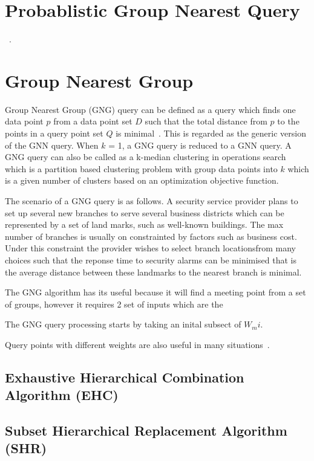 \documentclass[a4paper,11pt]{article}
\begin{document}
\section{Probablistic Group Nearest Query}

~\cite{lian2008probabilistic}.

\section{Group Nearest Group}

Group Nearest Group (GNG) query can be defined as a query which finds one data
point $p$ from a data point set $D$ such that the total distance from $p$ to
the points in a query point set $Q$ is minimal~\cite{deng2012group}. This is
regarded as the generic version of the GNN query. When $k$ = 1, a GNG query is
reduced to a GNN query. A GNG query can also be called as a k-median
clustering in operations search which is a partition based clustering problem
with group data points into $k$ which is a given number of clusters based on
an optimization objective function.

The scenario of a GNG query is as follows. A security service provider plans
to set up several new branches to serve several business districts which can
be represented by a set of land marks, such as well-known buildings. The max
number of branches is usually on constrainted by factors such as business
cost. Under this constraint the provider wishes to select branch locationsfrom
many choices such that the reponse time to security alarms can be minimised
that is the average distance between these landmarks to the nearest branch is
minimal.

The GNG algorithm has its useful because it will find a meeting point from a
set of groups, however it requires 2 set of inputs which are the

The GNG query processing starts by taking an inital subsect of $W_mi$. 

Query points with different weights are also useful in many
situations~\cite{deng2012group}.

\subsection{Exhaustive Hierarchical Combination Algorithm (EHC)}

\subsection{Subset Hierarchical Replacement Algorithm (SHR)}
\end{document}
